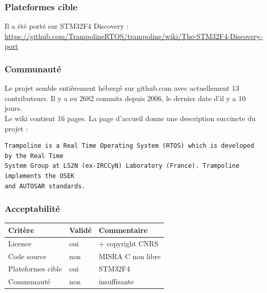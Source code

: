 \subsubsection{Plateformes cible}
Il a été porté sur STM32F4 Discovery :
\url{https://github.com/TrampolineRTOS/trampoline/wiki/The-STM32F4-Discovery-port}

\subsubsection{Communauté}
Le projet semble entièrement hébergé sur github.com avec actuellement 13
contributeurs. Il y a eu 2682 commits depuis 2006, le dernier date d'il y a 10 jours.
\\

Le wiki contient 16 pages. La page d'accueil donne une description succincte du
projet :
{\small
\begin{verbatim}
Trampoline is a Real Time Operating System (RTOS) which is developed by the Real Time
System Group at LS2N (ex-IRCCyN) Laboratory (France). Trampoline implements the OSEK
and AUTOSAR standards.
\end{verbatim}
}
\subsubsection{Acceptabilité}
\begin{tabular}{lll}
\toprule
	Critère				&	Validé		&	Commentaire	\\
\midrule
	Licence				&	oui			&	+ copyright CNRS	\\
	Code source			&	non			&	MISRA C non libre	\\
	Plateformes cible	&	oui			&	STM32F4	\\
	Communauté			&	non			&	insuffisante	\\
\bottomrule
\end{tabular}

